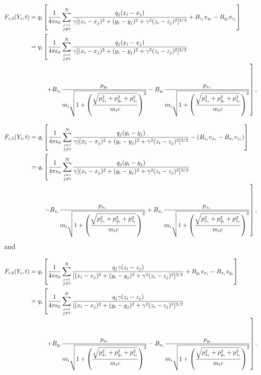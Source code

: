 \documentclass[oneside,12pt]{book}
\begin{document}
\begin{align*}
F_{i,4} (Y_i,t)&=q_i\left[
\dfrac{1}{4 \pi \epsilon_0}
\mathop{\sum}_{\stackrel{j=1}{j \neq i}}^N
 \dfrac{q_j(x_i-x_j)}{\gamma[(x_i-x_j)^2+(y_i-y_j)^2+\gamma^2(z_i-z_j)^2]^{3 \slash 2}} +B_{z_i} v_{y_i} - B_{y_i} v_{z_i}\right]\\
&=q_i \left[ \dfrac{1}{4 \pi \epsilon_0}\sum_{\stackrel{j=1}{j \neq i}}^N \dfrac{q_j(x_i-x_j)}{\gamma[(x_i-x_j)^2+(y_i-y_j)^2+\gamma^2(z_i-z_j)^2]^{3 \slash 2}} \right.\\
&\hspace*{6ex}\left.+B_{z_i} \dfrac{p_{y_i}}{m_i \sqrt{1+\left(\dfrac{\sqrt{p_{x_i}^2 + p_{y_i}^2 + p_{z_i}^2}}{m_i c}\right)^2}} - B_{y_i} \dfrac{p_{z_i}}{m_i \sqrt{1+\left(\dfrac{\sqrt{p_{x_i}^2 + p_{y_i}^2 + p_{z_i}^2}}{m_i c}\right)^2}} \right],
\end{align*}


\begin{align*}
F_{i,5}(Y_i,t)&=q_i\left[
\dfrac{1}{4 \pi \epsilon_0}
\mathop{\sum}_{\stackrel{j=1}{j \neq i}}^N
 \dfrac{q_j(y_i-y_j)}{\gamma[(x_i-x_j)^2+(y_i-y_j)^2+\gamma^2(z_i-z_j)^2]^{3 \slash 2}}  -(B_{z_i} v_{x_i} - B_{x_i} v_{z_i})\right]\\
&=q_i\left[ \dfrac{1}{4 \pi \epsilon_0} \mathop{\sum}_{\stackrel{j=1}{j \neq i}}^N \dfrac{q_j(y_i-y_j)}{\gamma[(x_i-x_j)^2+(y_i-y_j)^2+\gamma^2(z_i-z_j)^2]^{3 \slash 2}}\right.\\
&\left.\hspace*{5ex}-B_{z_i} \dfrac{p_{x_i}}{m_i \sqrt{1+\left(\dfrac{\sqrt{p_{x_i}^2 + p_{y_i}^2 + p_{z_i}^2}}{m_i c}\right)^2}}  + B_{x_i} \dfrac{p_{z_i}}{m_i \sqrt{1+\left(\dfrac{\sqrt{p_{x_i}^2 + p_{y_i}^2 + p_{z_i}^2}}{m_i c}\right)^2}}\right],
\end{align*}
and

\begin{align*}
F_{i,6}(Y_i,t)&=q_i\left[
\dfrac{1}{4 \pi \epsilon_0}
\mathop{\sum}_{\stackrel{j=1}{j \neq i}}^N
 \dfrac{q_j\gamma(z_i-z_j)}{[(x_i-x_j)^2+(y_i-y_j)^2+\gamma^2(z_i-z_j)^2]^{3 \slash 2}} +B_{y_i} v_{x_i} - B_{x_i} v_{y_i}\right]\\
&=q_i\left[
\dfrac{1}{4 \pi \epsilon_0}
\mathop{\sum}_{\stackrel{j=1}{j \neq i}}^N \dfrac{q_j\gamma(z_i-z_j)}{[(x_i-x_j)^2+(y_i-y_j)^2+\gamma^2(z_i-z_j)^2]^{3 \slash 2}}\right. \\
&\left.\hspace*{6ex}+B_{y_i} \dfrac{p_{x_i}}{m_i \sqrt{1+\left(\dfrac{\sqrt{p_{x_i}^2 + p_{y_i}^2 + p_{z_i}^2}}{m_i c}\right)^2}} - B_{x_i} \dfrac{p_{y_i}}{m_i \sqrt{1+\left( \dfrac{\sqrt{p_{x_i}^2 + p_{y_i}^2 + p_{z_i}^2}}{m_i c}\right)^2}}\right].
\end{align*}
\end{document}
